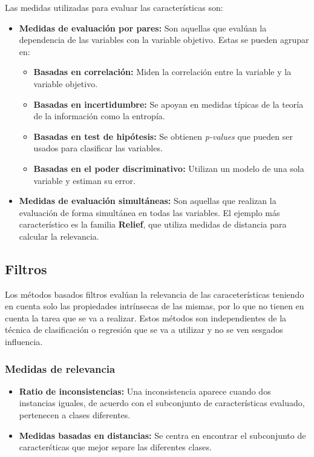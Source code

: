 \documentclass[12pt, letterpaper]{article}
\begin{document}
Las medidas utilizadas para evaluar las características son:
\begin{itemize}
    \item \textbf{Medidas de evaluación por pares:} Son aquellas que evalúan la dependencia de las variables con la variable objetivo. Estas se pueden agrupar en:
    \begin{itemize}
        \item \textbf{Basadas en correlación:} Miden la correlación entre la variable y la variable objetivo.
        \item \textbf{Basadas en incertidumbre:} Se apoyan en medidas típicas de la teoría de la información como la entropía.
        \item \textbf{Basadas en test de hipótesis:} Se obtienen \textit{p-values} que pueden ser usados para clasificar las variables.
        \item \textbf{Basadas en el poder discriminativo:} Utilizan un modelo de una sola variable y estiman su error.
    \end{itemize}
    \item \textbf{Medidas de evaluación simultáneas:} Son aquellas que realizan la evaluación de forma simultánea en todas las variables. El ejemplo más característico es la familia \textbf{Relief}, que utiliza medidas de distancia para calcular la relevancia.
\end{itemize}

\subsection{Filtros}
Los métodos basados filtros evalúan la relevancia de las caraceterísticas teniendo en cuenta solo las propiedades intrínsecas de las mismas, por lo que no tienen en cuenta la tarea que se va a realizar. Estos métodos son independientes de la técnica de clasificación o regresión que se va a utilizar y no se ven sesgados influencia.

\subsubsection{Medidas de relevancia}
\begin{itemize}
    \item \textbf{Ratio de inconsistencias:} Una inconsistencia aparece cuando dos instancias iguales, de acuerdo con el subconjunto de características evaluado, pertenecen a clases diferentes.
    \item \textbf{Medidas basadas en distancias:} Se centra en encontrar el subconjunto de caracterśticas que mejor separe las diferentes clases. 
\end{itemize}
\end{document}
